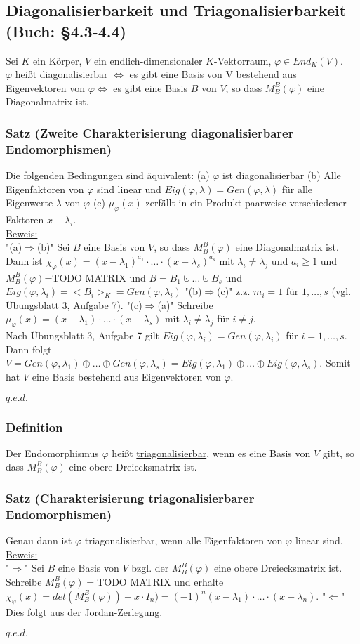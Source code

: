 \documentclass[a4paper]{article}
\newcommand{\ul}{\underline}
\renewcommand{\proof}{\ul{Beweis:}\\}
\renewcommand{\qed}{\begin{flushright}
\ul{\(q.e.d.\)}
\end{flushright}}
\let\phi\varphi
\begin{document}
\subsection{Diagonalisierbarkeit und Triagonalisierbarkeit (Buch: §4.3-4.4)}
Sei \(K\) ein Körper, \(V\) ein endlich-dimensionaler \(K\)-Vektorraum, \(\phi\in End_K(V)\).\\
\(\phi\) heißt diagonalisierbar \(\Leftrightarrow\) es gibt eine Basis von V bestehend aus Eigenvektoren von \(\phi \Leftrightarrow\) es gibt eine Basis \(B\) von \(V\), so dass \(M_B^B(\phi)\) eine Diagonalmatrix ist.
\subsubsection{Satz (Zweite Charakterisierung diagonalisierbarer Endomorphismen)}
Die folgenden Bedingungen sind äquivalent:
(a) \(\phi\) ist diagonalisierbar
(b) Alle Eigenfaktoren von \(\phi\) sind linear und \(Eig(\phi,\lambda)=Gen(\phi,\lambda)\) für alle Eigenwerte \(\lambda\) von \(\phi\)
(c) \(\mu_\phi(x)\) zerfällt in ein Produkt paarweise verschiedener Faktoren \(x-\lambda_i\).\\
\proof
"(a)\(\Rightarrow\)(b)" Sei \(B\) eine Basis von \(V\), so dass \(M_B^B(\phi)\) eine Diagonalmatrix ist. Dann ist \(\chi_\phi(x)=(x-\lambda_1)^{a_1}\cdot\dots\cdot(x-\lambda_s)^{a_s}\) mit \(\lambda_i\neq\lambda_j\) und \(a_i\geq 1\) und \(M_B^B(\phi)\)=TODO MATRIX und \(B=B_1\cupdot\dots\cupdot B_s\) und \(Eig(\phi,\lambda_i)=<B_i>_K=Gen(\phi,\lambda_i)\)
"(b)\(\Rightarrow\)(c)" \ul{z.z.} \(m_i=1\) für \(1,\dots,s\) (vgl. Übungsblatt 3, Aufgabe 7).
"(c)\(\Rightarrow\)(a)" Schreibe \(\mu_\phi(x)=(x-\lambda_1)\cdot\dots\cdot(x-\lambda_s)\) mit \(\lambda_i\neq\lambda_j\) für \(i\neq j\).\\
Nach Übungsblatt 3, Aufgabe 7 gilt \(Eig(\phi,\lambda_i)=Gen(\phi,\lambda_i)\) für \(i=1,\dots,s\).\\
Dann folgt \(V=Gen(\phi,\lambda_1)\oplus\dots\oplus Gen(\phi,\lambda_s)=Eig(\phi,\lambda_1)\oplus\dots\oplus Eig(\phi,\lambda_s)\). Somit hat \(V\) eine Basis bestehend aus Eigenvektoren von \(\phi\).
\qed
\subsubsection{Definition}
Der Endomorphismus \(\phi\) heißt \ul{triagonalisierbar}, wenn es eine Basis von \(V\) gibt, so dass \(M_B^B(\phi)\) eine obere Dreiecksmatrix ist.
\subsubsection{Satz (Charakterisierung triagonalisierbarer Endomorphismen)}
Genau dann ist \(\phi\) triagonalisierbar, wenn alle Eigenfaktoren von \(\phi\) linear sind.\\
\proof
"\(\Rightarrow\)" Sei \(B\) eine Basis von \(V\) bzgl. der \(M_B^B(\phi)\) eine obere Dreiecksmatrix ist. Schreibe \(M_B^B(\phi)=\)TODO MATRIX und erhalte \(\chi_\phi(x)=det(M_B^B(\phi))-x\cdot I_n)=(-1)^n(x-\lambda_1)\cdot\dots\cdot (x-\lambda_n)\).
"\(\Leftarrow\)" Dies folgt aus der Jordan-Zerlegung.
\qed
\end{document}
